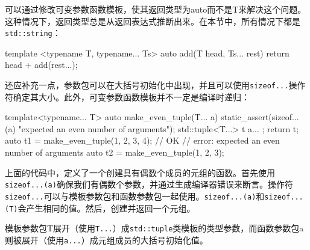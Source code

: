 可以通过修改可变参数函数模板，使其返回类型为auto而不是T来解决这个问题。这种情况下，返回类型总是从返回表达式推断出来。在本节中，所有情况下都是\verb|std::string|：

\begin{cpp}
template <typename T, typename... Ts>
auto add(T head, Ts... rest)
{
    return head + add(rest...);
}
\end{cpp}

还应补充一点，参数包可以在大括号初始化中出现，并且可以使用\verb|sizeof...|操作符确定其大小。此外，可变参数函数模板并不一定是编译时递归：

\begin{cpp}
template<typename... T>
auto make_even_tuple(T... a)
{
    static_assert(sizeof...(a) %
    "expected an even number of arguments");
    std::tuple<T...> t { a... };
    return t;
}
auto t1 = make_even_tuple(1, 2, 3, 4); // OK
// error: expected an even number of arguments
auto t2 = make_even_tuple(1, 2, 3);
\end{cpp}

上面的代码中，定义了一个创建具有偶数个成员的元组的函数。首先使用\verb|sizeof...(a)|确保我们有偶数个参数，并通过生成编译器错误来断言。操作符\verb|sizeof...|可以与模板参数包和函数参数包一起使用。\verb|sizeof...(a)|和\verb|sizeof...(T)|会产生相同的值。然后，创建并返回一个元组。

模板参数包T展开（使用\verb|T...|）成\verb|std::tuple|类模板的类型参数，而函数参数包a则被展开（使用\verb|a...|）成元组成员的大括号初始化值。



